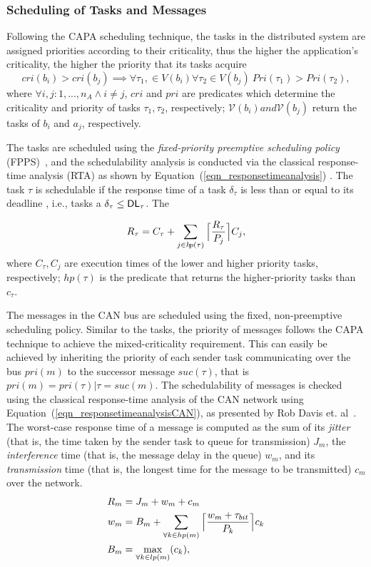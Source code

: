 \subsubsection{Scheduling of Tasks and Messages}\label{subsec_response-time_analysis}
Following the CAPA scheduling technique, the tasks in the distributed system are assigned priorities according to their criticality, thus the higher the application's criticality, the higher the priority that its tasks acquire
\[
cri(b_i)>cri(b_j)\implies \forall \tau_1,\in V(b_i)\forall \tau_2\in V(b_j)\ Pri(\tau_1)>Pri(\tau_2),
\]
where $\forall i,j:1,...,n_A\land i\neq j$, $cri$ and $pri$ are predicates which determine the criticality and priority of tasks $\tau_1,\tau_2$, respectively; $\mathcal{V}(b_i) and \mathcal{V}(b_j)$ return the tasks of $b_i$ and $a_j$, respectively.

The tasks are scheduled using the \textit{fixed-priority preemptive scheduling policy} (FPPS)~\cite{Sha2004RealPerspective}, and the schedulability analysis is conducted via the classical response-time analysis (RTA) as shown by Equation~(\ref{eqn_responsetimeanalysis}) \cite{Baruah2011Response-timeSystems}. The task $\tau$ is schedulable if the response time of a task $\delta_\tau$ is less than or equal to its deadline \ttDL, i.e., tasks a $\delta_\tau\leq \mathsf{DL}_\tau$. The

\begin{align}
\label{eqn_responsetimeanalysis}
R_\tau=C_\tau+\sum_{j\in h\!p(\tau)}
{
	\ceil[\Big]
	{
		\frac{R_\tau}{P_j}
	}C_j
},
\end{align}
where $C_\tau,C_j$ are execution times of the lower and higher priority tasks, respectively; $h\!p(\tau)$ is the predicate that returns the higher-priority tasks than $c_\tau$.

The messages in the CAN bus are scheduled using the fixed, non-preemptive scheduling policy. Similar to the tasks, the priority of messages follows the CAPA technique to achieve the mixed-criticality requirement. This can easily be achieved by inheriting the priority of each sender task communicating over the bus $pri(m)$ to the successor message $suc(\tau)$, that is $pri(m)=pri(\tau)|\tau = suc(m)$. The schedulability of messages is checked using the classical response-time analysis of the CAN network using Equation~(\ref{eqn_responsetimeanalysisCAN}), as presented by Rob Davis et. al~\cite{Davis2007ControllerRevised}. The worst-case response time of a message is computed as the sum of its \textit{jitter} (that is, the time  taken by the sender task to queue for transmission) $J_m$, the \textit{interference} time (that is, the message delay in the queue) $w_m$, and its \textit{transmission} time  (that is, the longest time for the message to be transmitted) $c_m$ over the network.
\begin{align}
\label{eqn_responsetimeanalysisCAN}
R_m&=J_m+w_m+c_m\\
\label{eqn_interference}
w_m&=B_m+
\sum_{\forall k\in hp(m)}
{
	\ceil[\Big]
	{
		\frac{w_m+\tau_{bit}}{P_k}
	}c_k
}\\
\label{eqn_iblocking}
B_m&=\max_{\forall k\in lp(m)}(c_k),
\end{align}

